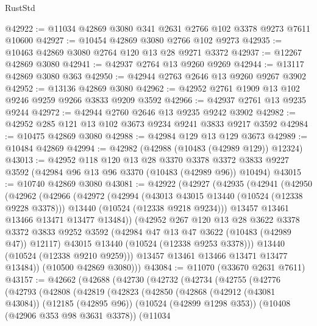 \begin{lexlean}{RustStd}
\begin{coremodule}
@42922 := @11034 @42869 @3080 @341 @2631 @2766 @102 @3378 @9273 @7611 @10600
@42927 := @10454 @42869 @3080 @2766 @102 @9273
@42935 := @10463 @42869 @3080 @2764 @120 @13 @28 @9271 @3372
@42937 := @12267 @42869 @3080
@42941 := @42937 @2764 @13 @9260 @9269
@42944 := @13117 @42869 @3080 @363
@42950 := @42944 @2763 @2646 @13 @9260 @9267 @3902
@42952 := @13136 @42869 @3080
@42962 := @42952 @2761 @1909 @13 @102 @9246 @9259 @9266 @3833 @9209 @3592
@42966 := @42937 @2761 @13 @9235 @9244
@42972 := @42944 @2760 @2646 @13 @9235 @9242 @3902
@42982 := @42952 @285 @121 @13 @102 @3673 @9234 @9241 @3833 @9217 @3592
@42984 := @10475 @42869 @3080
@42988 := @42984 @129 @13 @129 @3673
@42989 := @10484 @42869
@42994 := @42982 (@42988 (@10483 (@42989 @129)) @12324)
@43013 := @42952
    @118
    @120
    @13
    @28
    @3370
    @3378
    @3372
    @3833
    @9227
    @3592
    (@42984 @96 @13 @96 @3370 (@10483 (@42989 @96)) @10494)
@43015 := @10740 @42869 @3080
@43081 := @42922
    (@42927
      (@42935
        (@42941
          (@42950
            (@42962
              (@42966
                (@42972
                  (@42994
                    (@43013 @43015 @13440 (@10524 (@12338 @9228 @3378)))
                    @13440
                    (@10524 (@12338 @9218 @9234)))
                  @13457
                  @13461
                  @13466
                  @13471
                  @13477
                  @13484))
              (@42952
                @267
                @120
                @13
                @28
                @3622
                @3378
                @3372
                @3833
                @9252
                @3592
                (@42984 @47 @13 @47 @3622 (@10483 (@42989 @47)) @12117)
                @43015
                @13440
                (@10524 (@12338 @9253 @3378)))
              @13440
              (@10524 (@12338 @9210 @9259)))
            @13457
            @13461
            @13466
            @13471
            @13477
            @13484))
        (@10500 @42869 @3080)))
@43084 := @11070 (@33670 @2631 @7611)
@43157 := @42662
    (@42688
      (@42730
        (@42732
          (@42734
            (@42755
              (@42776
                (@42793
                  (@42808
                    (@42819
                      (@42823
                        (@42850
                          (@42868
                            (@42912 (@43081 @43084))
                            (@12185 (@42895 @96))
                            (@10524 (@42899 @1298 @353))
                            (@10408 (@42906 @353 @98 @3631 @3378))
                            (@11034

\end{coremodule}
\end{lexlean}
